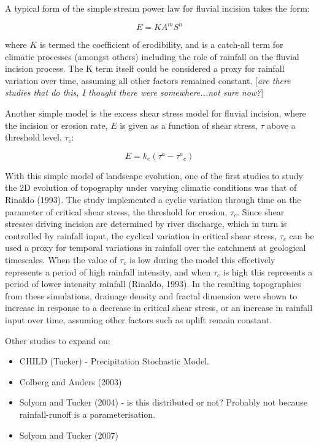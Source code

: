 A typical form of the simple stream power law for fluvial incision takes the form:

\begin{equation}
E = KA^mS^n
\end{equation}

where \(K\) is termed the coefficient of erodibility, and is a catch-all term for climatic processes (amongst others) including the role of rainfall on the fluvial incision process. The K term itself could be considered a proxy for rainfall variation over time, assuming all other factors remained constant. [\textit{are there studies that do this, I thought there were somewhere...not sure now?}]

Another simple model is the excess shear stress model for fluvial incision, where the incision or erosion rate, \(E\) is given as a function of shear stress, \(\tau\) above a threshold level, \(\tau_c\):

\begin{equation}
E = k_e(\tau^a -  {\tau^a}_c)
\end{equation}

With this simple model of landscape evolution, one of the first studies to study the 2D evolution of topography under varying climatic conditions was that of Rinaldo (1993). The study implemented a cyclic variation through time on the parameter of critical shear stress, the threshold for erosion, \(\tau_c\). Since shear stresses driving incision are determined by river discharge, which in turn is controlled by rainfall input, the cyclical variation in critical shear stress, \(\tau_c\) can be used a proxy for temporal variations in rainfall over the catchment at geological timescales. When the value of \(\tau_c\) is low during the model this effectively represents a period of high rainfall intensity, and when \(\tau_c\) is high this represents a period of lower intensity rainfall (Rinaldo, 1993). In the resulting topographies from these simulations, drainage density and fractal dimension were shown to increase in response to a decrease in critical shear stress, or an increase in rainfall input over time, assuming other factors such as uplift remain constant.

Other studies to expand on:
\begin{itemize}
\item CHILD (Tucker) - Precipitation Stochastic Model.
\item Colberg and Anders (2003)
\item Solyom and Tucker (2004) - is this distributed or not? Probably not because rainfall-runoff is a parameterisation.
\item Solyom and Tucker (2007)
\end{itemize}

